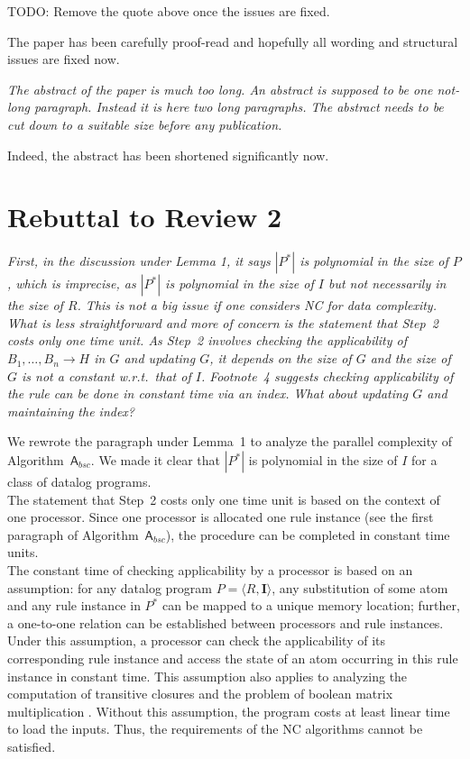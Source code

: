 \documentclass{article}
\let\quoteOld\quote
\let\endquoteOld\endquote
\renewenvironment{quote}{\quoteOld\itshape}{\endquoteOld}
\begin{document}
TODO: Remove the quote above once the issues are fixed.

The paper has been carefully proof-read and hopefully all wording and structural issues are fixed now.

\begin{quote}
The abstract of the paper is much too long.  An abstract is supposed to be
one not-long paragraph.  Instead it is here two long paragraphs.  The
abstract needs to be cut down to a suitable size before any publication.
\end{quote}

Indeed, the abstract has been shortened significantly now.


\section{Rebuttal to Review 2}

\begin{quote}
First, in the discussion under Lemma 1, it says $|P^*|$ is polynomial in the size of $P$, which is imprecise, as $|P^*|$ is polynomial in the size of $I$ but not necessarily in the size of $R$. This is not a big issue if one considers NC for data complexity. What is less straightforward and more of concern is the statement that Step~2 costs only one time unit. As Step~2 involves checking the applicability of $B_1, \ldots, B_n \to H$ in $G$ and updating $G$, it depends on the size of $G$ and the size of $G$ is not a constant w.r.t.\ that of $I$. Footnote~4 suggests checking applicability of the rule can be done in constant time via an index. What about updating $G$ and maintaining the index?
\end{quote}

We rewrote the paragraph under Lemma~1 to analyze the parallel complexity of Algorithm~$\mathsf{A}_{bsc}$.
We made it clear that $|P^*|$ is polynomial in the size of $I$ for a class of datalog programs.\\

The statement that Step~2 costs only one time unit is based on the context of one processor. Since one processor
is allocated one rule instance (see the first paragraph of Algorithm~$\mathsf{A}_{bsc}$),
the procedure can be completed in constant time units. \\

The constant time of checking applicability by a processor is based on an assumption:
for any datalog program $P=\langle R, \textbf{I}\rangle$,
any substitution of some atom and any rule instance in $P^*$ can be mapped to a unique memory
location; further, a one-to-one relation can be established between processors and rule instances.
Under this assumption, a processor can check the applicability of its corresponding
rule instance and access the state of an atom occurring in this rule instance in constant time.
This assumption also applies to analyzing the computation of transitive closures \cite{Allender07} and
the problem of boolean matrix multiplication \cite{Raymond95}. Without this assumption, the program
costs at least linear time to load the inputs. Thus, the requirements of the NC algorithms
cannot be satisfied.\\
\end{document}
